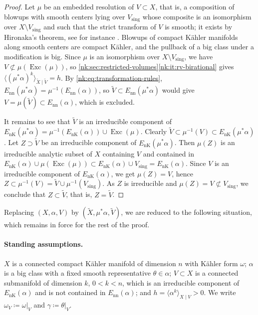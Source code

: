 \begin{proof}
Let $\mu$ be an embedded resolution of $V\subset X$, that is, a
composition of blowups with smooth centers lying over
$V_{\mathrm{sing}}$ whose composite is an isomorphism over
$X\setminus V_{\mathrm{sing}}$ and such that the strict transform of
$V$ is smooth; it exists by Hironaka's theorem, see for instance
\cite{BM97}. Blowups of compact K\"ahler
manifolds along smooth centers are compact K\"ahler, and the pullback of
a big class under a modification is big. Since $\mu$ is an isomorphism
over $X\setminus V_{\mathrm{sing}}$, we have
$V\not\subset\mu(\operatorname{Exc}(\mu))$, so
\cref{nk:sec:restricted-volumes}\ref{nk:it:rv-birational} gives
$\langle(\mu^*\alpha)^k\rangle_{\widetilde X\mid\widetilde V}=h$. By
\eqref{nk:eq:transformation-rules},
${E_{\mathrm{nn}}}(\mu^*\alpha)=\mu^{-1}({E_{\mathrm{nn}}}(\alpha))$, so
$\widetilde V\subset{E_{\mathrm{nn}}}(\mu^*\alpha)$ would give
$V=\mu(\widetilde V)\subset{E_{\mathrm{nn}}}(\alpha)$, which is excluded.

It remains to see that $\widetilde V$ is an irreducible component of
${E_{\mathrm{nK}}}(\mu^*\alpha)=\mu^{-1}({E_{\mathrm{nK}}}(\alpha))\cup\operatorname{Exc}(\mu)$. Clearly
$\widetilde V\subset\mu^{-1}(V)\subset{E_{\mathrm{nK}}}(\mu^*\alpha)$. Let
$Z\supset\widetilde V$ be an irreducible component of
${E_{\mathrm{nK}}}(\mu^*\alpha)$. Then $\mu(Z)$ is an irreducible analytic subset of
$X$ containing $V$ and contained in
${E_{\mathrm{nK}}}(\alpha)\cup\mu(\operatorname{Exc}(\mu))\subset{E_{\mathrm{nK}}}(\alpha)\cup V_{\mathrm{sing}}
={E_{\mathrm{nK}}}(\alpha)$. Since $V$ is an irreducible component of
${E_{\mathrm{nK}}}(\alpha)$, we get $\mu(Z)=V$, hence
$Z\subset\mu^{-1}(V)=\widetilde V\cup\mu^{-1}(V_{\mathrm{sing}})$. As
$Z$ is irreducible and $\mu(Z)=V\not\subset V_{\mathrm{sing}}$, we
conclude that $Z\subset\widetilde V$, that is, $Z=\widetilde V$.
\end{proof}

Replacing $(X,\alpha,V)$ by $(\widetilde X,\mu^*\alpha,\widetilde V)$,
we are reduced to the following situation, which remains in force for the
rest of the proof.

\paragraph{Standing assumptions.}
$X$ is a connected compact K\"ahler manifold of dimension $n$ with
K\"ahler form $\omega$; $\alpha$ is a big class with a fixed smooth
representative $\theta\in\alpha$; $V\subset X$ is a connected
submanifold of dimension $k$, $0<k<n$, which is an irreducible
component of ${E_{\mathrm{nK}}}(\alpha)$ and is not contained in ${E_{\mathrm{nn}}}(\alpha)$;
and $h=\langle\alpha^k\rangle_{X\mid V}>0$. We write
$\omega_V\coloneqq \omega|_V$ and $\gamma\coloneqq \theta|_V$.


